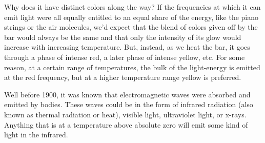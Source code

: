 Why does it have distinct colors along the way? If the frequencies at
which it can emit light were all equally entitled to an equal share of
the energy, like the piano strings or the air molecules, we'd expect
that the blend of colors given off by the bar would always be the same
and that only the intensity of its glow would increase with increasing
temperature. But, instead, as we heat the bar, it goes through a phase
of intense red, a later phase of intense yellow, etc. For some reason,
at a certain range of temperatures, the bulk of the light-energy is
emitted at the red frequency, but at a higher temperature range yellow
is preferred.

Well before 1900, it was known that electromagnetic waves were absorbed
and emitted by bodies. These waves could be in the form of infrared
radiation (also known as thermal radiation or heat), visible light,
ultraviolet light, or x-rays. Anything that is at a temperature above
absolute zero will emit some kind of light in the infrared.

